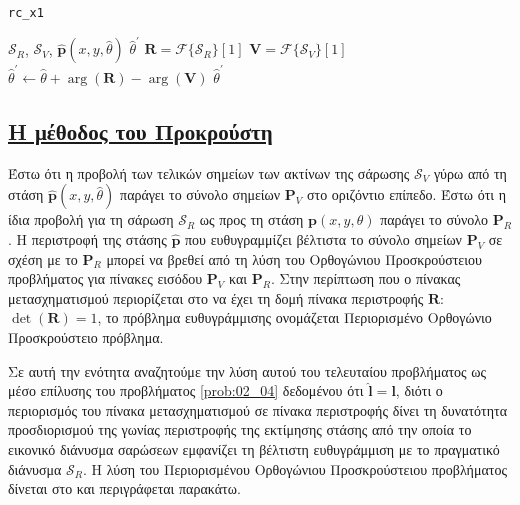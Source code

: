 \begin{algorithm}[!h]
  \caption{\texttt{rc\_x1}}
  \label{alg:algorithm_x1rc}
  \begin{spacing}{1.3}
  \begin{algorithmic}[1]
    \REQUIRE $\mathcal{S}_R$, $\mathcal{S}_V$, $\hat{\bm{p}}(x, y, \hat{\theta})$
    \ENSURE $\hat{\theta}^\prime$
    \STATE $\bm{R} = \mathcal{F}\{\mathcal{S}_R\}[1]$
    \STATE $\bm{V} = \mathcal{F}\{\mathcal{S}_V\}[1]$
    \STATE $\hat{\theta}^\prime \leftarrow \hat{\theta} + \arg(\bm{R}) - \arg(\bm{V})$
    \RETURN $\hat{\theta}^\prime$
  \end{algorithmic}
  \end{spacing}
\end{algorithm}

\subsection{\texorpdfstring{\protect\href{https://www.youtube.com/watch?v=AeYNkEwGmYU}{Η μέθοδος του Προκρούστη}}{Η μέθοδος του Προκρούστη}}
\label{subsection:02_04_02:03}

Έστω ότι η προβολή των τελικών σημείων των ακτίνων της σάρωσης $\mathcal{S}_V$
γύρω από τη στάση $\hat{\bm{p}}(x,y,\hat{\theta})$ παράγει το σύνολο σημείων
$\bm{P}_V$ στο οριζόντιο επίπεδο. Έστω ότι η ίδια προβολή για τη σάρωση
$\mathcal{S}_R$ ως προς τη στάση $\bm{p}(x,y,\theta)$ παράγει το σύνολο
$\bm{P}_R$. Η περιστροφή της στάσης $\hat{\bm{p}}$ που ευθυγραμμίζει βέλτιστα
το σύνολο σημείων $\bm{P}_V$ σε σχέση με το $\bm{P}_R$ μπορεί να βρεθεί από τη
λύση του Ορθογώνιου Προσκρούστειου προβλήματος \cite{Schonemann1966a} για
πίνακες εισόδου $\bm{P}_V$ και $\bm{P}_R$. Στην περίπτωση που ο πίνακας
μετασχηματισμού περιορίζεται στο να έχει τη δομή πίνακα περιστροφής $\bm{R}$:
$\det{(\bm{R})} = 1$, το πρόβλημα ευθυγράμμισης ονομάζεται Περιορισμένο
Ορθογώνιο Προσκρούστειο πρόβλημα.

Σε αυτή την ενότητα αναζητούμε την λύση αυτού του τελευταίου προβλήματος ως
μέσο επίλυσης του προβλήματος \ref{prob:02_04} δεδομένου ότι $\hat{\bm{l}} =
\bm{l}$, διότι ο περιορισμός του πίνακα μετασχηματισμού σε πίνακα περιστροφής
δίνει τη δυνατότητα προσδιορισμού της γωνίας περιστροφής της εκτίμησης στάσης
από την οποία το εικονικό διάνυσμα σαρώσεων εμφανίζει τη βέλτιστη ευθυγράμμιση
με το πραγματικό διάνυσμα $\mathcal{S}_R$. Η λύση του Περιορισμένου Ορθογώνιου
Προσκρούστειου προβλήματος δίνεται στο \cite{Umeyama1991} και περιγράφεται
παρακάτω.


